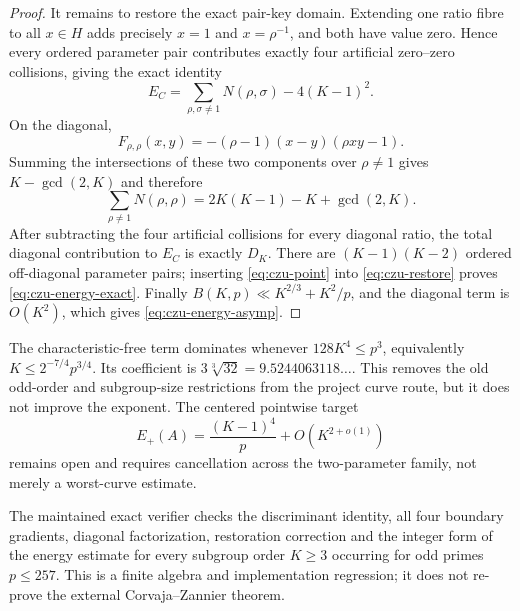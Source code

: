 \begin{proof}
It remains to restore the exact pair-key domain.  Extending one ratio fibre
to all $x\in H$ adds precisely $x=1$ and $x=\rho^{-1}$, and both have value
zero.  Hence every ordered parameter pair contributes exactly four
artificial zero--zero collisions, giving the exact identity
\begin{equation}\label{eq:czu-restore}
 E_C=\sum_{\rho,\sigma\neq1}N(\rho,\sigma)-4(K-1)^2.
\end{equation}
On the diagonal,
\[
 F_{\rho,\rho}(x,y)=-(\rho-1)(x-y)(\rho xy-1).
\]
Summing the intersections of these two components over $\rho\neq1$ gives
$K-\gcd(2,K)$ and therefore
\[
 \sum_{\rho\neq1}N(\rho,\rho)
 =2K(K-1)-K+\gcd(2,K).
\]
After subtracting the four artificial collisions for every diagonal ratio,
the total diagonal contribution to $E_C$ is exactly $D_K$.  There are
$(K-1)(K-2)$ ordered off-diagonal parameter pairs; inserting
\eqref{eq:czu-point} into \eqref{eq:czu-restore} proves
\eqref{eq:czu-energy-exact}.  Finally
$B(K,p)\ll K^{2/3}+K^2/p$, and the diagonal term is $O(K^2)$, which gives
\eqref{eq:czu-energy-asymp}.
\end{proof}

\begin{remark}
The characteristic-free term dominates whenever
$128K^4\leq p^3$, equivalently
$K\leq2^{-7/4}p^{3/4}$.  Its coefficient is
$3\sqrt[3]{32}=9.5244063118\ldots$.  This removes the old odd-order and
subgroup-size restrictions from the project curve route, but it does not
improve the exponent.  The centered pointwise target
\[
 E_+(A)=\frac{(K-1)^4}{p}+O\!\left(K^{2+o(1)}\right)
\]
remains open and requires cancellation across the two-parameter family,
not merely a worst-curve estimate.
\end{remark}

\begin{remark}
The maintained exact verifier checks the discriminant identity, all four
boundary gradients, diagonal factorization, restoration correction and the
integer form of the energy estimate for every subgroup order $K\geq3$
occurring for odd primes $p\leq257$.  This is a finite algebra and
implementation regression; it does not re-prove the external Corvaja--Zannier theorem.
\end{remark}

